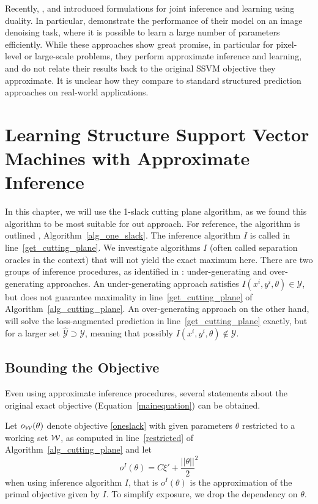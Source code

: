 Recently, \citet{meshi2010learning}, \citet{hazan2010primal} and
\citet{komodakis2011efficient} introduced formulations for joint inference and
learning using duality.
In particular, \citet{hazan2010primal} demonstrate the performance of their
model on an image denoising task, where it is possible to learn a large number
of parameters efficiently.
While these approaches show great promise, in particular for pixel-level or
large-scale problems, they perform approximate inference and learning, and do
not relate their results back to the original SSVM objective they approximate.
It is unclear how they compare to standard structured prediction approaches
on real-world applications.


\section{Learning Structure Support Vector Machines with Approximate Inference}
In this chapter, we will use the 1-slack cutting plane algorithm, as we found this
algorithm to be most suitable for out approach. For reference, the algorithm is outlined
, Algorithm~\ref{alg_one_slack}. The inference algorithm $I$ is called
in line~\ref{get_cutting_plane}. We investigate algorithms $I$ (often called separation
oracles in the context) that will not yield the exact maximum here.
There are two groups of inference procedures, as identified in
\citet{finley2008training}: under-generating and over-generating approaches.
An under-generating approach satisfies $I(x^i, y^i, \theta) \in
\mathcal{Y}$, but does not guarantee maximality in line~\ref{get_cutting_plane}
of Algorithm~\ref{alg_cutting_plane}. An over-generating approach on the other
hand, will solve the loss-augmented prediction in line~\ref{get_cutting_plane}
exactly, but for a larger set $\hat{\mathcal{Y}} \supset \mathcal{Y}$, meaning
that possibly $I(x^i, y^i, \theta) \notin \mathcal{Y}$.

\subsection{Bounding the Objective}\label{bounds}
Even using approximate inference procedures, several statements
about the original exact objective (Equation~\eqref{mainequation}) can be
obtained.

Let $o_{\mathcal{W}}(\theta)$ denote objective \eqref{oneslack} with
given parameters $\theta$ restricted to a working set $\mathcal{W}$, as computed in
line~\ref{restricted} of Algorithm~\ref{alg_cutting_plane} and  let
\[
    o^I(\theta) = C\xi' + \frac{||\theta||}{2}^2
\]
when using inference algorithm $I$, that is $o^I(\theta)$ is the approximation of the primal
objective given by $I$. To simplify exposure, we drop the dependency on $\theta$.

